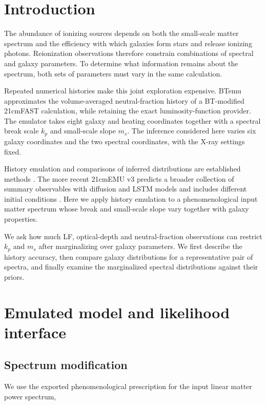 \section{Introduction}\label{introduction}

The abundance of ionizing sources depends on both the small-scale matter spectrum and the efficiency with which galaxies form stars and release ionizing photons. Reionization observations therefore constrain combinations of spectral and galaxy parameters. To determine what information remains about the spectrum, both sets of parameters must vary in the same calculation.

Repeated numerical histories make this joint exploration expensive. BTemu approximates the volume-averaged neutral-fraction history of a BT-modified 21cmFAST calculation, while retaining the exact luminosity-function provider. The emulator takes eight galaxy and heating coordinates together with a spectral break scale $k_p$ and small-scale slope $m_s$. The inference considered here varies six galaxy coordinates and the two spectral coordinates, with the X-ray settings fixed.

History emulation and comparisons of inferred distributions are established methods \cite{Breitman2024}. The more recent 21cmEMU v3 predicts a broader collection of summary observables with diffusion and LSTM models and includes different initial conditions \cite{Breitman2026}. Here we apply history emulation to a phenomenological input matter spectrum whose break and small-scale slope vary together with galaxy properties.

We ask how much LF, optical-depth and neutral-fraction observations can restrict $k_p$ and $m_s$ after marginalizing over galaxy parameters. We first describe the history accuracy, then compare galaxy distributions for a representative pair of spectra, and finally examine the marginalized spectral distributions against their priors.

\section{Emulated model and likelihood interface}\label{physical-model-and-simulations}

\subsection{Spectrum modification}\label{spectrum-modification}

We use the exported phenomenological prescription for the input linear matter power spectrum,

